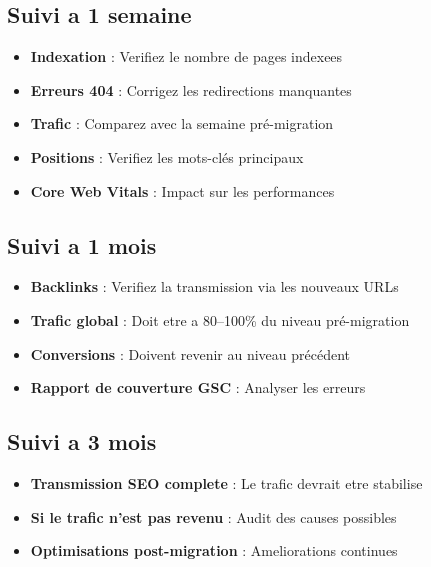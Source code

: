 \documentclass[12pt,a4paper,twoside]{report}
\begin{document}
\subsection{Suivi a 1 semaine}

\begin{itemize}
    \item \textbf{Indexation} : Verifiez le nombre de pages indexees
    \item \textbf{Erreurs 404} : Corrigez les redirections manquantes
    \item \textbf{Trafic} : Comparez avec la semaine pré-migration
    \item \textbf{Positions} : Verifiez les mots-clés principaux
    \item \textbf{Core Web Vitals} : Impact sur les performances
\end{itemize}

\subsection{Suivi a 1 mois}

\begin{itemize}
    \item \textbf{Backlinks} : Verifiez la transmission via les nouveaux URLs
    \item \textbf{Trafic global} : Doit etre a 80--100\% du niveau pré-migration
    \item \textbf{Conversions} : Doivent revenir au niveau précédent
    \item \textbf{Rapport de couverture GSC} : Analyser les erreurs
\end{itemize}

\subsection{Suivi a 3 mois}

\begin{itemize}
    \item \textbf{Transmission SEO complete} : Le trafic devrait etre stabilise
    \item \textbf{Si le trafic n'est pas revenu} : Audit des causes possibles
    \item \textbf{Optimisations post-migration} : Ameliorations continues
\end{itemize}
\end{document}
